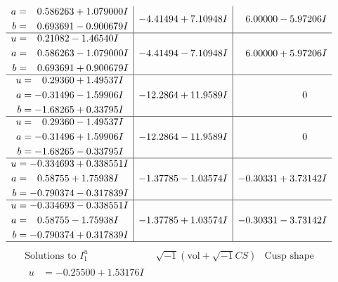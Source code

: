 \documentclass[1p]{elsarticle_modified}
\theoremstyle{definition}
\newcommand{\I}{\sqrt{-1}}
\begin{document}
$$\begin{array}{c|c|c}
\begin{aligned}
a &= \phantom{-}0.586263 + 1.079000 I \\
b &= \phantom{-}0.693691 - 0.900679 I\end{aligned}
 & -4.41494 + 7.10948 I & \phantom{-}6.00000 - 5.97206 I \\ \hline\begin{aligned}
u &= \phantom{-}0.21082 - 1.46540 I \\
a &= \phantom{-}0.586263 - 1.079000 I \\
b &= \phantom{-}0.693691 + 0.900679 I\end{aligned}
 & -4.41494 - 7.10948 I & \phantom{-}6.00000 + 5.97206 I \\ \hline\begin{aligned}
u &= \phantom{-}0.29360 + 1.49537 I \\
a &= -0.31496 - 1.59906 I \\
b &= -1.68265 + 0.33795 I\end{aligned}
 & -12.2864 + 11.9589 I & \phantom{-0.000000 } 0 \\ \hline\begin{aligned}
u &= \phantom{-}0.29360 - 1.49537 I \\
a &= -0.31496 + 1.59906 I \\
b &= -1.68265 - 0.33795 I\end{aligned}
 & -12.2864 - 11.9589 I & \phantom{-0.000000 } 0 \\ \hline\begin{aligned}
u &= -0.334693 + 0.338551 I \\
a &= \phantom{-}0.58755 + 1.75938 I \\
b &= -0.790374 - 0.317839 I\end{aligned}
 & -1.37785 - 1.03574 I & -0.30331 + 3.73142 I \\ \hline\begin{aligned}
u &= -0.334693 - 0.338551 I \\
a &= \phantom{-}0.58755 - 1.75938 I \\
b &= -0.790374 + 0.317839 I\end{aligned}
 & -1.37785 + 1.03574 I & -0.30331 - 3.73142 I\\
 \hline 
 \end{array}$$\newpage$$\begin{array}{c|c|c}  
\text{Solutions to }I^u_{1}& \I (\text{vol} + \sqrt{-1}CS) & \text{Cusp shape}\\
 \hline 
\begin{aligned}
u &= -0.25500 + 1.53176 I \\

\end{aligned}
\end{array}$$
\end{document}
